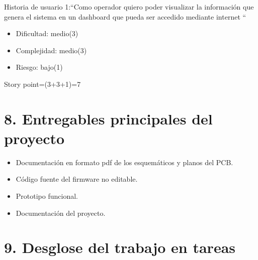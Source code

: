\documentclass[
11pt, %
codirector, %
]{charter}
\begin{document}
Historia de usuario 1:``Como operador quiero poder visualizar la información que genera el sistema en un dashboard
que pueda ser accedido mediante internet
``
\begin{itemize}
	\item Dificultad: medio(3) 
	\item Complejidad: medio(3)
	\item Riesgo: bajo(1)  
\end{itemize}
Story point=(3+3+1)=7

\section{8. Entregables principales del proyecto}
\label{sec:entregables}

\begin{itemize}
	\item Documentación en formato pdf de los esquemáticos y planos del PCB.
	\item Código fuente del firmware no editable.
	\item Prototipo funcional.
	\item Documentación del proyecto.
\end{itemize}

\section{9. Desglose del trabajo en tareas}
\label{sec:wbs}
\end{document}
